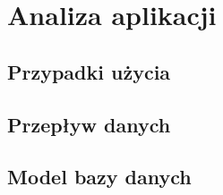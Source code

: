 \chapter{Analiza aplikacji}
\label{cha:analizaAplikacji}

\section{Przypadki użycia}
\label{sec:przypadkiUzycia}

\section{Przepływ danych}
\label{sec:przeplywDanych}

\section{Model bazy danych}
\label{sec;modelBazyDanych}
